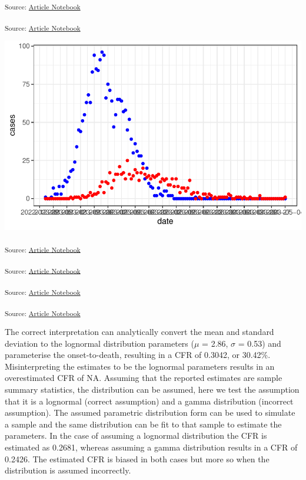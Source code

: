 \documentclass[
  10pt,
  letterpaper,
]{article}
\begin{document}
\begin{tcolorbox}[enhanced jigsaw, breakable, rightrule=.15mm, leftrule=.75mm, left=2mm, colframe=quarto-callout-tip-color-frame, toprule=.15mm, bottomrule=.15mm, opacityback=0, colback=white, arc=.35mm]
\textsubscript{Source:
\href{https://joshwlambert.github.io/epiparameterReportingGuidance/index.qmd.html}{Article
Notebook}}

\textsubscript{Source:
\href{https://joshwlambert.github.io/epiparameterReportingGuidance/index.qmd.html}{Article
Notebook}}

\includegraphics{index_files/figure-pdf/unnamed-chunk-3-1.pdf}

\textsubscript{Source:
\href{https://joshwlambert.github.io/epiparameterReportingGuidance/index.qmd.html}{Article
Notebook}}

\textsubscript{Source:
\href{https://joshwlambert.github.io/epiparameterReportingGuidance/index.qmd.html}{Article
Notebook}}

\textsubscript{Source:
\href{https://joshwlambert.github.io/epiparameterReportingGuidance/index.qmd.html}{Article
Notebook}}

\textsubscript{Source:
\href{https://joshwlambert.github.io/epiparameterReportingGuidance/index.qmd.html}{Article
Notebook}}

The correct interpretation can analytically convert the mean and
standard deviation to the lognormal distribution parameters (\(\mu\) =
2.86, \(\sigma\) = 0.53) and parameterise the onset-to-death, resulting
in a CFR of 0.3042, or 30.42\%. Misinterpreting the estimates to be the
lognormal parameters results in an overestimated CFR of NA. Assuming
that the reported estimates are sample summary statistics, the
distribution can be assumed, here we test the assumption that it is a
lognormal (correct assumption) and a gamma distribution (incorrect
assumption). The assumed parametric distribution form can be used to
simulate a sample and the same distribution can be fit to that sample to
estimate the parameters. In the case of assuming a lognormal
distribution the CFR is estimated as 0.2681, whereas assuming a gamma
distribution results in a CFR of 0.2426. The estimated CFR is biased in
both cases but more so when the distribution is assumed incorrectly.

\end{tcolorbox}
\end{document}
